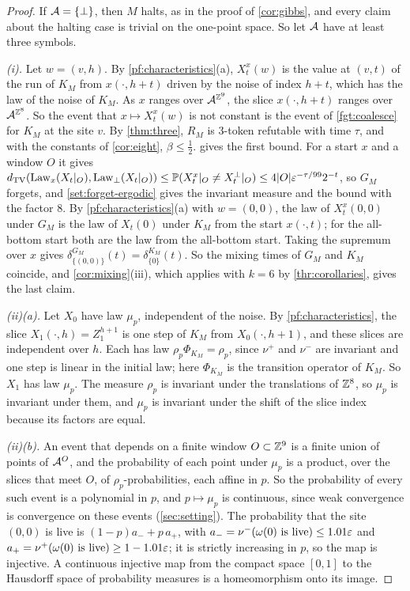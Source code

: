 \begin{proof}
If $\mathcal{A}=\{\bot\}$, then $M$ halts, as in the proof of \cref{cor:gibbs}, and every claim about the halting case is trivial on the one-point space. So let $\mathcal{A}$ have at least three symbols.

\emph{(i).} Let $w=(v,h)$. By \cref{pf:characteristics}(a), $X^x_t(w)$ is the value at $(v,t)$ of the run of $K_M$ from $x(\cdot,h+t)$ driven by the noise of index $h+t$, which has the law of the noise of $K_M$. As $x$ ranges over $\mathcal{A}^{\mathbb{Z}^9}$, the slice $x(\cdot,h+t)$ ranges over $\mathcal{A}^{\mathbb{Z}^8}$. So the event that $x\mapsto X^x_t(w)$ is not constant is the event of \cref{fgt:coalesce} for $K_M$ at the site $v$. By \cref{thm:three}, $R_M$ is $3$-token refutable with time $\tau$, and with the constants of \cref{cor:eight}, $\beta\le\frac12$.  gives the first bound. For a start $x$ and a window $O$ it gives $d_{\mathrm{TV}}(\mathrm{Law}_x(X_t|_O),\mathrm{Law}_\bot(X_t|_O))\le\mathbb{P}(X^x_t|_O\ne X^\bot_t|_O)\le4|O|\varepsilon^{-\tau/99}2^{-t}$, so $G_M$ forgets, and \cref{set:forget-ergodic} gives the invariant measure and the bound with the factor $8$. By \cref{pf:characteristics}(a) with $w=(0,0)$, the law of $X^x_t(0,0)$ under $G_M$ is the law of $X_t(0)$ under $K_M$ from the start $x(\cdot,t)$; for the all-bottom start both are the law from the all-bottom start. Taking the supremum over $x$ gives $\delta^{G_M}_{\{(0,0)\}}(t)=\delta^{K_M}_{\{0\}}(t)$. So the mixing times of $G_M$ and $K_M$ coincide, and \cref{cor:mixing}(iii), which applies with $k=6$ by \cref{thr:corollaries}, gives the last claim.

\emph{(ii)(a).} Let $X_0$ have law $\mu_p$, independent of the noise. By \cref{pf:characteristics}, the slice $X_1(\cdot,h)=Z^{h+1}_1$ is one step of $K_M$ from $X_0(\cdot,h+1)$, and these slices are independent over $h$. Each has law $\rho_p\Phi_{K_M}=\rho_p$, since $\nu^+$ and $\nu^-$ are invariant and one step is linear in the initial law; here $\Phi_{K_M}$ is the transition operator of $K_M$. So $X_1$ has law $\mu_p$. The measure $\rho_p$ is invariant under the translations of $\mathbb{Z}^8$, so $\mu_p$ is invariant under them, and $\mu_p$ is invariant under the shift of the slice index because its factors are equal.

\emph{(ii)(b).} An event that depends on a finite window $O\subset\mathbb{Z}^9$ is a finite union of points of $\mathcal{A}^O$, and the probability of each point under $\mu_p$ is a product, over the slices that meet $O$, of $\rho_p$-probabilities, each affine in $p$. So the probability of every such event is a polynomial in $p$, and $p\mapsto\mu_p$ is continuous, since weak convergence is convergence on these events (\cref{sec:setting}). The probability that the site $(0,0)$ is live is $(1-p)a_-+p\,a_+$, with $a_-=\nu^-(\omega(0)\text{ is live})\le1.01\varepsilon$ and $a_+=\nu^+(\omega(0)\text{ is live})\ge1-1.01\varepsilon$; it is strictly increasing in $p$, so the map is injective. A continuous injective map from the compact space $[0,1]$ to the Hausdorff space of probability measures is a homeomorphism onto its image.


\end{proof}
